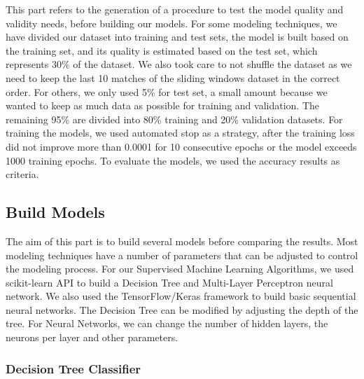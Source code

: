 This part refers to the generation of a procedure to test the model quality and validity needs, before building our models. \newline \newline
For some modeling techniques, we have divided our dataset into training and test sets, the model is built based on the training set, and its quality is estimated based on the test set, which represents 30\% of the dataset. \newline
We also took care to not shuffle the dataset as we need to keep the last 10 matches of the sliding windows dataset in the correct order. \newline 
For others, we only used 5\% for test set, a small amount because we wanted to keep as much data as possible for training and validation. The remaining 95\% are divided into 80\% training and 20\% validation datasets.\newline \newline
For training the models, we used automated stop as a strategy, after the training loss did not improve more than 0.0001 for 10 consecutive epochs or the model exceeds 1000 training epochs.\newline \newline
To evaluate the models, we used the accuracy results as criteria.


\subsection{Build Models}

The aim of this part is to build several models before comparing the results.\newline
Most modeling techniques have a number of parameters that can be adjusted to control the modeling process.\newline \newline
For our Supervised Machine Learning Algorithms, we used scikit-learn API to build a Decision Tree and Multi-Layer Perceptron neural network. We also used the TensorFlow/Keras framework to build basic sequential neural networks.\newline \newline
The Decision Tree can be modified by adjusting the depth of the tree. For Neural Networks, we can change the number of hidden layers, the neurons per layer and other parameters.


\subsubsection{Decision Tree Classifier}

